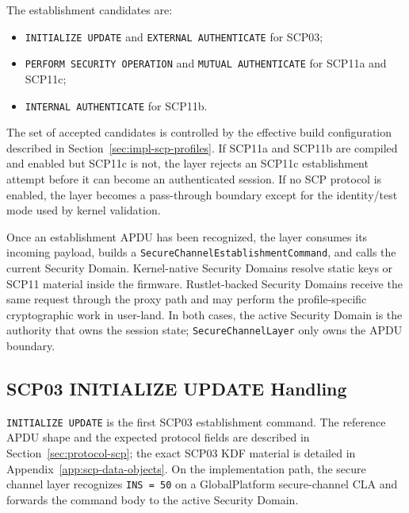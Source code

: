 The establishment candidates are:
\begin{itemize}
\item \texttt{INITIALIZE UPDATE} and \texttt{EXTERNAL AUTHENTICATE} for SCP03;
\item \texttt{PERFORM SECURITY OPERATION} and \texttt{MUTUAL AUTHENTICATE} for
  SCP11a and SCP11c;
\item \texttt{INTERNAL AUTHENTICATE} for SCP11b.
\end{itemize}

The set of accepted candidates is controlled by the effective build
configuration described in Section~\ref{sec:impl-scp-profiles}. If SCP11a and
SCP11b are compiled and enabled but SCP11c is not, the layer rejects an SCP11c
establishment attempt before it can become an authenticated session. If no SCP
protocol is enabled, the layer becomes a pass-through boundary except for the
identity/test mode used by kernel validation.

Once an establishment APDU has been recognized, the layer consumes its incoming
payload, builds a \texttt{SecureChannelEstablishmentCommand}, and calls the
current Security Domain. Kernel-native Security Domains resolve static keys or
SCP11 material inside the firmware. Rustlet-backed Security Domains receive the
same request through the proxy path and may perform the profile-specific
cryptographic work in user-land. In both cases, the active Security Domain is
the authority that owns the session state; \texttt{SecureChannelLayer} only
owns the APDU boundary.

\subsection{SCP03 INITIALIZE UPDATE Handling}
\label{sec:impl-scp-init}

\texttt{INITIALIZE UPDATE} is the first SCP03 establishment command. The
reference APDU shape and the expected protocol fields are described in
Section~\ref{sec:protocol-scp}; the exact SCP03 KDF material is detailed in
Appendix~\ref{app:scp-data-objects}. On the implementation path, the secure
channel layer recognizes \texttt{INS = 50} on a GlobalPlatform secure-channel
CLA and forwards the command body to the active Security Domain.

